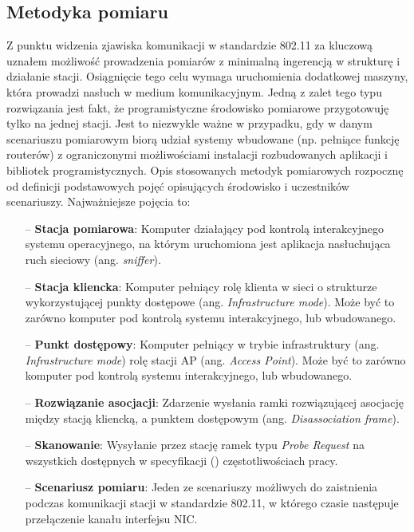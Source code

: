 \subsection{Metodyka pomiaru}
Z punktu widzenia zjawiska komunikacji w standardzie 802.11 za kluczową uznałem możliwość prowadzenia pomiarów z minimalną ingerencją w strukturę i działanie stacji. Osiągnięcie tego celu wymaga uruchomienia dodatkowej maszyny, która prowadzi nasłuch w medium komunikacyjnym. Jedną z zalet tego typu rozwiązania jest fakt, że programistyczne środowisko pomiarowe przygotowuję tylko na jednej stacji. Jest to niezwykle ważne w przypadku, gdy w danym scenariuszu pomiarowym biorą udział systemy wbudowane (np. pełniące funkcję routerów) z ograniczonymi możliwościami instalacji rozbudowanych aplikacji i bibliotek programistycznych. 
Opis stosowanych metodyk pomiarowych rozpocznę od definicji podstawowych pojęć opisujących środowisko i uczestników scenariuszy. Najważniejsze pojęcia to:
\begin{itemize}
\item[--] {\bf Stacja pomiarowa}: Komputer działający pod kontrolą interakcyjnego systemu operacyjnego, na którym uruchomiona jest aplikacja nasłuchująca ruch sieciowy (ang. \emph{sniffer}).
\item[--] {\bf Stacja kliencka}: Komputer pełniący rolę klienta w sieci o strukturze wykorzystującej punkty dostępowe (ang. \emph{Infrastructure mode}). Może być to zarówno komputer pod kontrolą systemu interakcyjnego, lub wbudowanego.
\item[--] {\bf Punkt dostępowy}: Komputer pełniący w trybie infrastruktury (ang. \emph{Infrastructure mode}) rolę stacji AP (ang. \emph{Access Point}). Może być to zarówno komputer pod kontrolą systemu interakcyjnego, lub wbudowanego.
\item[--] {\bf Rozwiązanie asocjacji}: Zdarzenie wysłania ramki rozwiązującej asocjację między stacją kliencką, a punktem dostępowym (ang. \emph{Disassociation frame}).
\item[--] {\bf Skanowanie}: Wysyłanie przez stację ramek typu \emph{Probe Request} na wszystkich dostępnych w specyfikacji (\cite{std:IEEE80211}) częstotliwościach pracy.
\item[--] {\bf Scenariusz pomiaru}: Jeden ze scenariuszy możliwych do zaistnienia podczas komunikacji stacji w standardzie 802.11, w którego czasie następuje przełączenie kanału interfejsu NIC.
\end{itemize}

